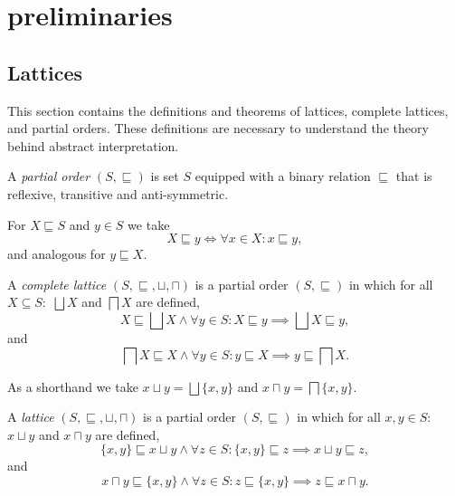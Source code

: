 
\section{preliminaries}\label{sec:preliminaries}

\subsection{Lattices}\label{sec:lattices}
This section contains the definitions and theorems of lattices, complete lattices, and partial orders.
These definitions are necessary to understand the theory behind abstract interpretation.\cite{nielson_formal_2019}

\begin{definition}
    A \textit{partial order} $(S, \sqsubseteq)$ is set $S$ equipped with a binary relation $\sqsubseteq$ that is reflexive, transitive and anti-symmetric.
\end{definition}

For $X \sqsubseteq S$ and $y \in S$ we take
\begin{equation*}
    X \sqsubseteq y \iff \forall x \in X : x \sqsubseteq y,
\end{equation*}
and analogous for $y \sqsubseteq X$.

\begin{definition}
    A \textit{complete lattice} $(S, \sqsubseteq, \sqcup, \sqcap)$ is a partial order $(S, \sqsubseteq)$ in which for all $X \subseteq S:$ $\bigsqcup X$ and $\bigsqcap X$ are defined,
        \begin{equation*}
            X \sqsubseteq \bigsqcup X \land \forall y \in S : X \sqsubseteq y \implies \bigsqcup X \sqsubseteq y,
        \end{equation*}
        and
        \begin{equation*}
            \bigsqcap X \sqsubseteq X \land \forall y \in S : y \sqsubseteq X \implies y \sqsubseteq \bigsqcap X.
        \end{equation*}
\end{definition}

As a shorthand we take $x \sqcup y = \bigsqcup \{x, y\}$ and $x \sqcap y = \bigsqcap \{x, y\}$.

\begin{definition}
    A \textit{lattice} $(S, \sqsubseteq, \sqcup, \sqcap)$ is a partial order $(S, \sqsubseteq)$ in which for all $x,y \in S:$ $x \sqcup y$ and $x \sqcap y$ are defined,
        \begin{equation*}
            \{x, y\} \sqsubseteq x \sqcup y \land \forall z \in S : \{x, y\} \sqsubseteq z \implies x \sqcup y \sqsubseteq z,
        \end{equation*}
        and
        \begin{equation*}
            x \sqcap y \sqsubseteq \{x, y\} \land \forall z \in S : z \sqsubseteq \{x, y\} \implies z \sqsubseteq x \sqcap y.
        \end{equation*}
\end{definition}

